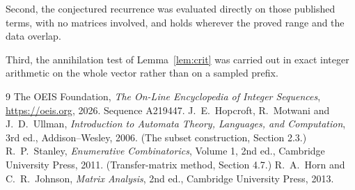 \documentclass[11pt,a4paper]{article}
\theoremstyle{plain}
\theoremstyle{definition}
\begin{document}
Second, the conjectured recurrence was evaluated directly on those published terms, with no
matrices involved, and holds wherever the proved range and the data overlap.

Third, the annihilation test of Lemma~\ref{lem:crit} was carried out in exact integer
arithmetic on the whole vector rather than on a sampled prefix.

\begin{thebibliography}{9}
 The OEIS Foundation, \emph{The On-Line Encyclopedia of Integer
Sequences}, \url{https://oeis.org}, 2026. Sequence A219447.
 J.~E.~Hopcroft, R.~Motwani and J.~D.~Ullman, \emph{Introduction to Automata
Theory, Languages, and Computation}, 3rd ed., Addison--Wesley, 2006. (The subset
construction, Section 2.3.)
 R.~P.~Stanley, \emph{Enumerative Combinatorics}, Volume 1, 2nd ed.,
Cambridge University Press, 2011. (Transfer-matrix method, Section 4.7.)
 R.~A.~Horn and C.~R.~Johnson, \emph{Matrix Analysis}, 2nd ed., Cambridge
University Press, 2013.
\end{thebibliography}
\end{document}
